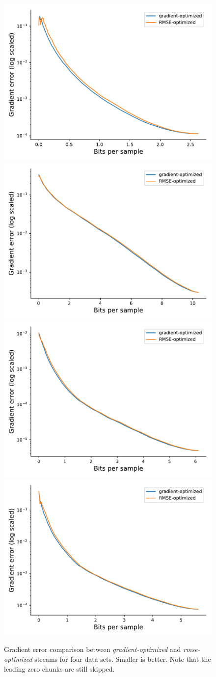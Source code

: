 \begin{figure}
	\centering
	{\includegraphics[width=0.48\linewidth]{img/gradient-laplacian/euler-gradient.pdf}}
	{\includegraphics[width=0.48\linewidth]{img/gradient-laplacian/magnetic-gradient.pdf}}
	{\includegraphics[width=0.48\linewidth]{img/gradient-laplacian/miranda-diffusivity-gradient.pdf}}
	{\includegraphics[width=0.48\linewidth]{img/gradient-laplacian/miranda-velocityz-gradient.pdf}}
	\caption{Gradient error comparison between \emph{gradient-optimized} and \emph{rmse-optimized}
	streams for four data sets. Smaller is better. Note that the leading zero chunks are still
	skipped.}
	\label{fig:gradient-error-comparison}
\end{figure}

